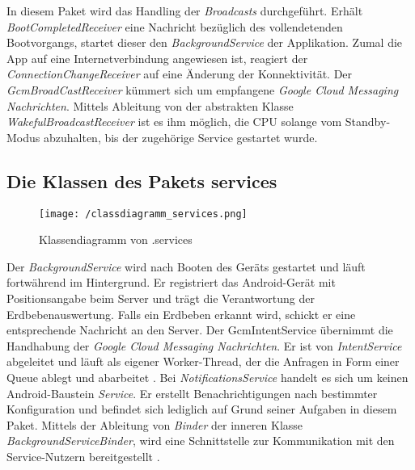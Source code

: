In diesem Paket wird das Handling der \emph{Broadcasts} durchgeführt.
Erhält \emph{BootCompletedReceiver} eine Nachricht bezüglich des vollendetenden
Bootvorgangs, startet dieser den \emph{BackgroundService} der Applikation. 
Zumal die App auf eine Internetverbindung angewiesen ist, reagiert der
\emph{ConnectionChangeReceiver} auf eine Änderung der Konnektivität. Der \emph{GcmBroadCastReceiver}
kümmert sich um empfangene \emph{Google Cloud Messaging Nachrichten}. Mittels Ableitung von
der abstrakten Klasse \emph{WakefulBroadcastReceiver} ist es ihm möglich, die CPU solange vom
Standby-Modus abzuhalten, bis der zugehörige Service gestartet wurde.


\subsection{Die Klassen des Pakets services}
\begin{figure}[H]
\centering
\texttt{[image: /classdiagramm\_services.png]}
\caption{Klassendiagramm von .services}
\label{fig:classdiagramm_services}
\end{figure}

Der \emph{BackgroundService} wird nach Booten des Geräts gestartet und läuft
fortwährend im Hintergrund. Er registriert das Android-Gerät mit Positionsangabe beim Server
und trägt die Verantwortung der Erdbebenauswertung. Falls ein Erdbeben erkannt wird,
schickt er eine entsprechende Nachricht an den Server. Der GcmIntentService übernimmt die
Handhabung der \emph{Google Cloud Messaging Nachrichten}. Er ist von
\emph{IntentService} abgeleitet und läuft als eigener Worker-Thread, der die Anfragen in Form einer
Queue ablegt und abarbeitet \cite[vgl.][]{ADevIntentService}. Bei \emph{NotificationsService}
handelt es sich um keinen Android-Baustein \emph{Service}. Er erstellt Benachrichtigungen nach
bestimmter Konfiguration und befindet sich lediglich auf Grund seiner Aufgaben in diesem Paket.
Mittels der Ableitung von \emph{Binder} der inneren Klasse \emph{BackgroundServiceBinder}, wird eine
Schnittstelle zur Kommunikation mit den Service-Nutzern bereitgestellt \cite[vgl.][S. 174]{AppsProg}.



